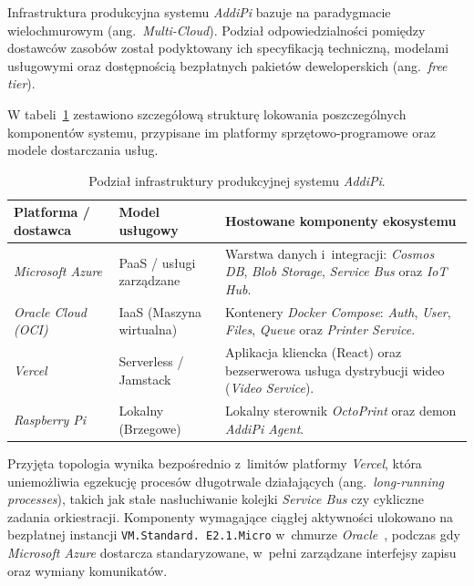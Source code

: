 \documentclass[a4paper,12pt,reqno]{article}
\begin{document}
Infrastruktura produkcyjna systemu \textit{AddiPi} bazuje na paradygmacie wielochmurowym (ang.~\textit{Multi-Cloud}). Podział odpowiedzialności pomiędzy dostawców zasobów został podyktowany ich specyfikacją techniczną, modelami usługowymi oraz dostępnością bezpłatnych pakietów deweloperskich (ang.~\textit{free tier}). 

W tabeli~\ref{tab:infrastructure_split} zestawiono szczegółową strukturę lokowania poszczególnych komponentów systemu, przypisane im platformy sprzętowo-programowe oraz modele dostarczania usług.

\begin{table}[htbp]
	\centering
	\caption{Podział infrastruktury produkcyjnej systemu \textit{AddiPi}.}
	\label{tab:infrastructure_split}
	\begin{tabular}{llp{5.5cm}}
		\toprule
		\textbf{Platforma / dostawca} & \textbf{Model usługowy} & \textbf{Hostowane komponenty ekosystemu} \\
		\midrule
		\textit{Microsoft Azure} & PaaS / usługi zarządzane & Warstwa danych i~integracji: \textit{Cosmos DB}, \textit{Blob Storage}, \textit{Service Bus} oraz \textit{IoT Hub}. \\
		\addlinespace
		\textit{Oracle Cloud (OCI)} & IaaS (Maszyna wirtualna) & Kontenery \textit{Docker Compose}: \textit{Auth}, \textit{User}, \textit{Files}, \textit{Queue} oraz \textit{Printer Service}. \\
		\addlinespace
		\textit{Vercel} & Serverless / Jamstack & Aplikacja kliencka (React) oraz bezserwerowa usługa dystrybucji wideo (\textit{Video Service}). \\
		\addlinespace
		\textit{Raspberry Pi} & Lokalny (Brzegowe) & Lokalny sterownik \textit{OctoPrint} oraz demon \textit{AddiPi Agent}. \\
		\bottomrule
	\end{tabular}
\end{table}

Przyjęta topologia wynika bezpośrednio z~limitów platformy \textit{Vercel}, która uniemożliwia egzekucję procesów długotrwale działających (ang.~\textit{long-running processes}), takich jak stałe nasłuchiwanie kolejki \textit{Service Bus} czy cykliczne zadania orkiestracji. Komponenty wymagające ciągłej aktywności ulokowano na bezpłatnej instancji \texttt{VM.Standard. \newline E2.1.Micro} w~chmurze \textit{Oracle}~\cite{oci}, podczas gdy \textit{Microsoft Azure} dostarcza standaryzowane, w~pełni zarządzane interfejsy zapisu oraz wymiany komunikatów.
\end{document}
